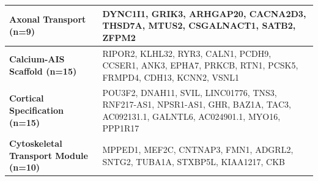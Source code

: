 \begin{longtable}{p{} p{}}
\hline
\textbf{Axonal Transport (n=9)} & DYNC1I1,  GRIK3,  ARHGAP20,  CACNA2D3,  THSD7A,  MTUS2,  CSGALNACT1,  SATB2,  ZFPM2 \\
\hline
\textbf{Calcium-AIS Scaffold (n=15)} & RIPOR2,  KLHL32,  RYR3,  CALN1,  PCDH9,  CCSER1,  ANK3,  EPHA7,  PRKCB,  RTN1,  PCSK5,  FRMPD4,  CDH13,  KCNN2,  VSNL1 \\
\hline
\textbf{Cortical Specification (n=15)} & POU3F2,  DNAH11,  SVIL,  LINC01776,  TNS3,  RNF217-AS1,  NPSR1-AS1,  GHR,  BAZ1A,  TAC3,  AC092131.1,  GALNTL6,  AC024901.1,  MYO16,  PPP1R17 \\
\hline
\textbf{Cytoskeletal Transport Module (n=10)} & MPPED1,  MEF2C,  CNTNAP3,  FMN1,  ADGRL2,  SNTG2,  TUBA1A,  STXBP5L,  KIAA1217,  CKB \\
\hline
\end{longtable}
